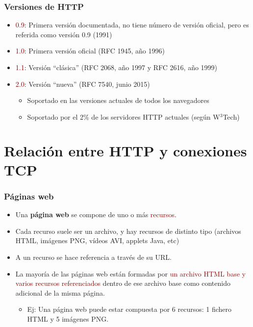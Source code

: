\documentclass[hyperref={pdfpagelabels=true},ucs]{beamer}
\newcommand{\res}[1]{\textcolor{darkred}{#1}}
\begin{document}

\begin{frame}
\frametitle{Versiones de HTTP}

\begin{itemize}
\item \res{0.9}: Primera versión documentada, no tiene número de
  versión oficial, pero es referida como versión 0.9 (1991)
\item \res{1.0}: Primera versión oficial (RFC 1945, año 1996)
\item \res{1.1}: Versión ``clásica'' (RFC 2068, año 1997 y RFC 2616, año 1999)
\item \res{2.0}: Versión ``nueva'' (RFC 7540, junio 2015)
  \begin{itemize}
  \item Soportado en las versiones actuales de todos los navegadores
  \item Soportado por el 2\% de los servidores HTTP actuales (según
    W$^3$Tech)
  \end{itemize}
\end{itemize}


\end{frame}




\section{Relación entre HTTP y conexiones TCP}




\begin{frame}
\frametitle{Páginas web}

\begin{itemize}
\item Una \textbf{página web} se compone de uno o más \res{recursos}.
\item Cada recurso suele ser un archivo, y hay recursos de distinto
  tipo (archivos HTML, imágenes PNG, vídeos AVI, applets Java, etc)
\item A un recurso se hace referencia a través de su URL.
\item La mayoría de las páginas web están formadas por \res{un archivo HTML
  base y varios recursos referenciados} dentro de ese archivo base como
  contenido adicional de la misma página.
  \begin{itemize}
  \item Ej: Una página web puede estar compuesta por 6 recursos: 1
    fichero HTML y 5 imágenes PNG.
  \end{itemize}

\end{itemize}

\end{frame}
\end{document}
